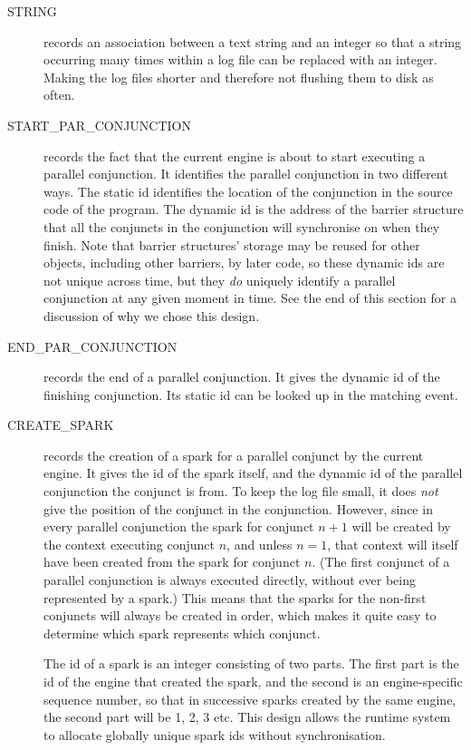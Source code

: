 \begin{description}

\item[STRING] records an association between a text string and an integer so
that a string occurring many times within a log file can be
replaced with an integer.
Making the log files shorter and therefore not flushing them to disk
as often.

\item[START\_PAR\_CONJUNCTION] records the fact that
the current engine is about to start executing a parallel conjunction.
It identifies the parallel conjunction in two different ways.
The static id identifies
the location of the conjunction in the source code of the program.
The dynamic id is the address of the barrier structure
that all the conjuncts in the conjunction will synchronise on when they finish.
Note that barrier structures' storage may be reused for other objects,
including other barriers, by later code,
so these dynamic ids are not unique across time,
but they \emph{do} uniquely identify a parallel conjunction
at any given moment in time.
See the end of this section for a discussion of why we chose this design.

\item[END\_PAR\_CONJUNCTION]
records the end of a parallel conjunction.
It gives the dynamic id of the finishing conjunction.
Its static id can be looked up in the matching
event.

\item[CREATE\_SPARK] records the creation of a spark
for a parallel conjunct by the current engine.
It gives the id of the spark itself,
and the dynamic id of the parallel conjunction the conjunct is from.
To keep the log file small,
it does \emph{not} give the position of the conjunct in the conjunction.
However, since in every parallel conjunction
the spark for conjunct $n+1$
will be created by the context executing conjunct $n$,
and unless $n=1$, that context will itself have been created
from the spark for conjunct $n$.
(The first conjunct of a parallel conjunction is always executed directly,
without ever being represented by a spark.)
This means that the sparks for the non-first conjuncts
will always be created in order,
which makes it quite easy to determine which spark represents which conjunct.

The id of a spark is an integer consisting of two parts.
The first part is the id of the engine that created the spark,
and the second is an engine-specific sequence number,
so that in successive sparks created by the same engine,
the second part will be 1, 2, 3 etc.
This design allows the runtime system
to allocate globally unique spark ids without synchronisation.


\end{description}
